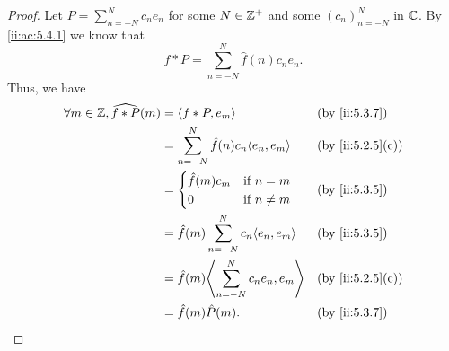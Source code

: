 \begin{proof}
  Let \(P = \sum_{n = -N}^N c_n e_n\) for some \(N \in \mathbb{Z}^+\) and some \((c_n)_{n = -N}^N\) in \(\mathbb{C}\).
  By \cref{ii:ac:5.4.1} we know that
  \[
    f * P = \sum_{n = -N}^N \hat{f}(n) c_n e_n.
  \]
  Thus, we have
  \begin{align*}
    \forall m \in \Z, \widehat{f * P}(m) & = \inner{f * P, e_m}                               &  & \by{ii:5.3.7}    \\
                                         & = \sum_{n = -N}^N \hat{f}(n) c_n \inner{e_n, e_m}  &  & \by{ii:5.2.5}[c] \\
                                         & = \begin{dcases}
                                               \hat{f}(m) c_m & \text{if } n = m    \\
                                               0              & \text{if } n \neq m
                                             \end{dcases}            &  & \by{ii:5.3.5}                             \\
                                         & = \hat{f}(m) \sum_{n = -N}^N c_n \inner*{e_n, e_m} &  & \by{ii:5.3.5}    \\
                                         & = \hat{f}(m) \inner*{\sum_{n = -N}^N c_n e_n, e_m} &  & \by{ii:5.2.5}[c] \\
                                         & = \hat{f}(m) \hat{P}(m).                           &  & \by{ii:5.3.7}
  \end{align*}


\end{proof}
